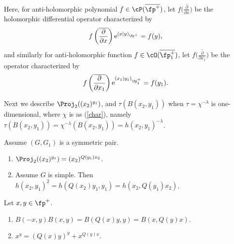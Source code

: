 Here, for anti-holomorphic polynomial $f\in\cP(\overline{\fp^+})$, let $f\big(\overline{\frac{\partial}{\partial x}}\big)$ be the
holomorphic differential operator characterized by
\begin{gather*} f\left(\overline{\frac{\partial}{\partial x}}\right){\rm e}^{(x|y)_{\fp^+}}=f(y), \end{gather*}
and similarly for anti-holomorphic function $f\in\cO(\overline{\fp^+_1})$, let $f\big(\overline{\frac{\partial}{\partial x_1}}\big)$ be the
operator characterized by
\begin{gather*} f\left(\overline{\frac{\partial}{\partial x_1}}\right){\rm e}^{(x_1|y_1)_{\fp^+_1}}=f(y_1). \end{gather*}

Next we describe $\Proj_2((x_2)^{y_1})$, and $\tau(B(x_2,y_1))$ when $\tau=\chi^{-\lambda}$ is one-dimensional, where $\chi$ is as (\ref{char}),
namely $\tau(B(x_2,y_1))=\chi^{-\lambda}(B(x_2,y_1))=h(x_2,y_1)^{-\lambda}$.
\begin{Proposition}\label{projprop}
Assume $(G,G_1)$ is a symmetric pair.
\begin{enumerate}\itemsep=0pt
\item[$(1)$] $\Proj_2((x_2)^{y_1})=(x_2)^{Q(y_1)x_2}$.
\item[$(2)$] Assume $G$ is simple. Then $h(x_2,y_1)^2=h(Q(x_2)y_1,y_1)=h(x_2,Q(y_1)x_2)$.
\end{enumerate}
\end{Proposition}
\begin{Lemma}\label{projlemma}
Let $x,y\in\fp^+$.
\begin{enumerate}\itemsep=0pt
\item[$(1)$] $B(-x,y)B(x,y)=B(Q(x)y,y)=B(x,Q(y)x)$.
\item[$(2)$] $x^y=(Q(x)y)^y+x^{Q(y)x}$.
\end{enumerate}
\end{Lemma}
